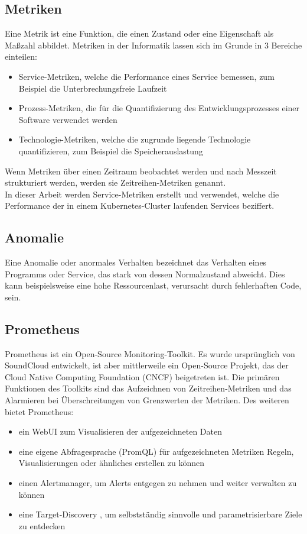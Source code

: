 \documentclass[a4paper,10pt]{scrartcl}
\begin{document}
\subsection{Metriken}
Eine Metrik ist eine Funktion, die einen Zustand oder eine Eigenschaft als Maßzahl
abbildet. Metriken in der Informatik lassen sich im Grunde in 3 Bereiche einteilen:
\begin{itemize}
\item Service-Metriken, welche die Performance eines Service bemessen, zum Beispiel die
Unterbrechungsfreie Laufzeit
\item Prozess-Metriken, die für die Quantifizierung des Entwicklungsprozesses einer Software verwendet werden
\item Technologie-Metriken, welche die zugrunde liegende Technologie quantifizieren, zum
Beispiel die Speicherauslastung
\end{itemize}

Wenn Metriken über einen Zeitraum beobachtet werden und nach Messzeit strukturiert werden, werden sie Zeitreihen-Metriken genannt.\\
In dieser Arbeit werden Service-Metriken erstellt und verwendet, welche die Performance der in einem Kubernetes-Cluster laufenden Services beziffert.


\subsection{Anomalie}

Eine Anomalie oder anormales Verhalten bezeichnet das Verhalten eines Programms oder Service, das stark von dessen Normalzustand abweicht. Dies kann beispielsweise eine hohe Ressourcenlast, verursacht durch fehlerhaften Code, sein. \cite{.19.07.2020d}

\subsection{Prometheus}
Prometheus ist ein Open-Source Monitoring-Toolkit. Es wurde ursprünglich von SoundCloud entwickelt, ist aber mittlerweile ein Open-Source Projekt, das der Cloud Native
Computing Foundation (CNCF) beigetreten ist. Die primären Funktionen des Toolkits
sind das Aufzeichnen von Zeitreihen-Metriken und das Alarmieren bei Überschreitungen
von Grenzwerten der Metriken. Des weiteren bietet Prometheus:\\

\begin{itemize} 
\item ein WebUI zum Visualisieren der aufgezeichneten Daten
\item eine eigene Abfragesprache (PromQL) für aufgezeichneten Metriken Regeln, Visualisierungen oder ähnliches erstellen zu können
\item einen Alertmanager, um Alerts entgegen zu nehmen und weiter verwalten zu können
\item eine \glqq Target-Discovery \grqq, um selbstständig sinnvolle und parametrisierbare Ziele zu entdecken

\end{itemize}
\end{document}
